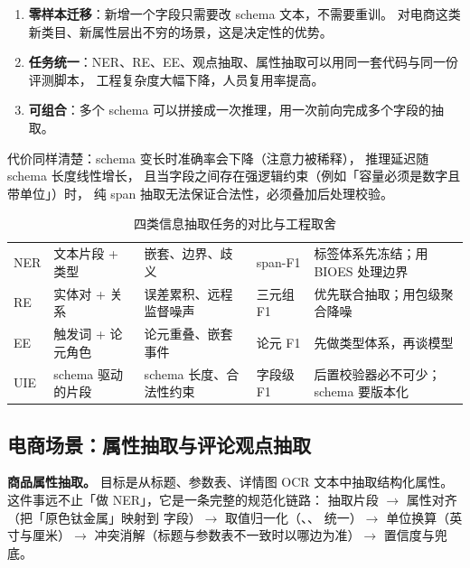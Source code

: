 \begin{enumerate}
  \item \textbf{零样本迁移}：新增一个字段只需要改 schema 文本，不需要重训。
        对电商这类新类目、新属性层出不穷的场景，这是决定性的优势。
  \item \textbf{任务统一}：NER、RE、EE、观点抽取、属性抽取可以用同一套代码与同一份评测脚本，
        工程复杂度大幅下降，人员复用率提高。
  \item \textbf{可组合}：多个 schema 可以拼接成一次推理，用一次前向完成多个字段的抽取。
\end{enumerate}

代价同样清楚：schema 变长时准确率会下降（注意力被稀释），
推理延迟随 schema 长度线性增长，
且当字段之间存在强逻辑约束（例如「容量必须是数字且带单位」）时，
纯 span 抽取无法保证合法性，必须叠加后处理校验。

\begin{table}[htbp]
\centering
\caption{四类信息抽取任务的对比与工程取舍}
\label{tab:ie-compare}
\small
\begin{tabularx}{\textwidth}{L{1.9cm} L{2.4cm} L{2.4cm} L{2.0cm} Y}
\toprule
{} &  &  &  &  \\
\midrule
NER & 文本片段 + 类型 & 嵌套、边界、歧义 & span-F1 & 标签体系先冻结；用 BIOES 处理边界 \\
\addlinespace
RE & 实体对 + 关系 & 误差累积、远程监督噪声 & 三元组 F1 & 优先联合抽取；用包级聚合降噪 \\
\addlinespace
EE & 触发词 + 论元角色 & 论元重叠、嵌套事件 & 论元 F1 & 先做类型体系，再谈模型 \\
\addlinespace
UIE & schema 驱动的片段 & schema 长度、合法性约束 & 字段级 F1 & 后置校验器必不可少；schema 要版本化 \\
\bottomrule
\end{tabularx}
\end{table}

\subsection{电商场景：属性抽取与评论观点抽取}

\textbf{商品属性抽取。} 目标是从标题、参数表、详情图 OCR 文本中抽取结构化属性。
这件事远不止「做 NER」，它是一条完整的规范化链路：
抽取片段 $\to$ 属性对齐（把「原色钛金属」映射到  字段）$\to$
取值归一化（、、 统一）$\to$
单位换算（英寸与厘米）$\to$ 冲突消解（标题与参数表不一致时以哪边为准）$\to$ 置信度与兜底。

